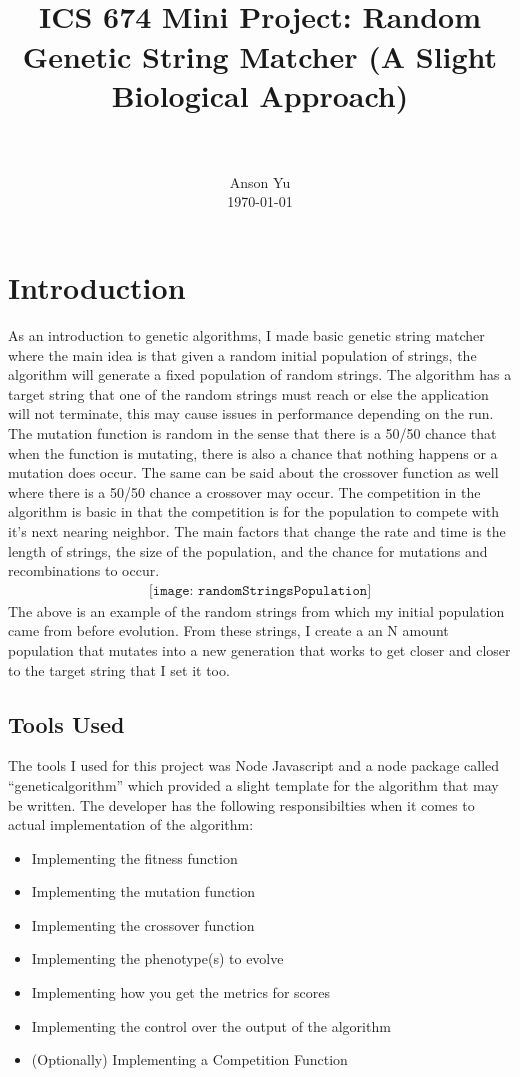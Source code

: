 \documentclass[paper=a4, fontsize=11pt]{scrartcl}
\title{
            \usefont{OT1}{bch}{b}{n}
            \horrule{0.5pt} \\[0.4cm]
            \huge ICS 674 Mini Project: Random Genetic String Matcher (A Slight Biological Approach)\\
            \horrule{2pt} \\[0.5cm]
    }
\author{
            \normalfont 								\normalsize
            Anson Yu \\[-3pt]		                    \normalsize
            \today
    }
\date{}
\numberwithin{equation}{section}		%
\numberwithin{figure}{section}			%
\numberwithin{table}{section}				%
\begin{document}
    \maketitle
    \section{Introduction}
    As an introduction to genetic algorithms, I made basic genetic string matcher where the main idea is that
    given a random initial population of strings, the algorithm will generate a fixed population of random strings.
    The algorithm has a target string that one of the random strings must reach or else the application will not 
    terminate, this may cause issues in performance depending on the run.  The mutation function is random in the sense
    that there is a 50/50 chance that when the function is mutating, there is also a chance that nothing happens or a 
    mutation does occur.  The same can be said about the crossover function as well where there is a 50/50 chance a 
    crossover may occur.  The competition in the algorithm is basic in that the competition is for the population
    to compete with it's next nearing neighbor.  The main factors that change the rate and time is the length of strings, 
    the size of the population, and the chance for mutations and recombinations to occur.
    \begin{align} 
        \texttt{[image: randomStringsPopulation]}				
    \end{align}
   The above is an example of the random strings from which my initial population came from before evolution. From these 
   strings, I create a an N amount population that mutates into a new generation that works to get closer and closer to
   the target string that I set it too.

    \subsection{Tools Used}
    The tools I used for this project was Node Javascript and a node package called ``geneticalgorithm'' which provided
    a slight template for the algorithm that may be written.  The developer has the following responsibilties when it comes to 
    actual implementation of the algorithm:

    \begin{itemize}
        \item Implementing the fitness function
        \item Implementing the mutation function
        \item Implementing the crossover function
        \item Implementing the phenotype(s) to evolve
        \item Implementing how you get the metrics for scores
        \item Implementing the control over the output of the algorithm
        \item (Optionally) Implementing a Competition Function
    \end{itemize}
\end{document}
